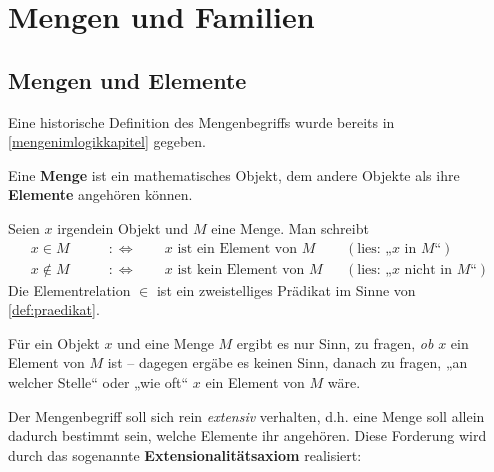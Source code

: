 


    
\chapter{Mengen und Familien} \label{chap:mengen}


\section{Mengen und Elemente}


Eine historische Definition des Mengenbegriffs wurde bereits in \cref{mengenimlogikkapitel} gegeben.


\begin{defin}[Menge] \label{def:menge} 
    Eine \textbf{Menge} ist ein mathematisches Objekt, dem andere Objekte als ihre \textbf{Elemente} angehören können.
\end{defin}


\begin{nota}[Elementzeichen]
    Seien $x$ irgendein Objekt und $M$ eine Menge. Man schreibt
    \begin{align*}
        x  \in M \qquad&:\Leftrightarrow\qquad \text{$x$ ist ein Element von $M$} && (\text{lies: „$x$ in $M$“})\\
        x\notin M \qquad &:\Leftrightarrow\qquad \text{$x$ ist kein Element von $M$} && (\text{lies: „$x$ nicht in $M$“})
    \end{align*}
    Die Elementrelation $\in$ ist ein zweistelliges Prädikat im Sinne von \cref{def:praedikat}.

    Für ein Objekt $x$ und eine Menge $M$ ergibt es nur Sinn, zu fragen, \emph{ob} $x$ ein Element von $M$ ist -- dagegen ergäbe es keinen Sinn, danach zu fragen, „an welcher Stelle“ oder „wie oft“ $x$ ein Element von $M$ wäre.
\end{nota}


Der Mengenbegriff soll sich rein \emph{extensiv} verhalten, d.h. eine Menge soll allein dadurch bestimmt sein, welche Elemente ihr angehören. Diese Forderung wird durch das sogenannte \textbf{Extensionalitätsaxiom} realisiert:


